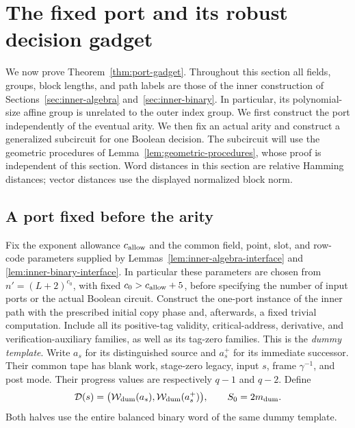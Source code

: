 \section{The fixed port and its robust decision gadget}\label{sec:inner-gadget}

We now prove Theorem~\ref{thm:port-gadget}. Throughout this section all
fields, groups, block lengths, and path labels are those of the inner
construction of Sections~\ref{sec:inner-algebra} and~\ref{sec:inner-binary}.
In particular, its polynomial-size affine group is unrelated to the outer
index group. We first construct the port independently of the eventual
arity. We then fix an actual arity and construct a generalized subcircuit
for one Boolean decision. The subcircuit will use the geometric procedures
of Lemma~\ref{lem:geometric-procedures}, whose proof is independent of this
section. Word distances in this section are relative Hamming distances;
vector distances use the displayed normalized block norm.

\subsection{A port fixed before the arity}

Fix the exponent allowance $c_{\rm allow}$ and the common field, point,
slot, and row-code parameters supplied by
Lemmas~\ref{lem:inner-algebra-interface} and
\ref{lem:inner-binary-interface}. In particular these parameters are
chosen from $n'=(L+2)^{c_0}$, with fixed $c_0>c_{\rm allow}+5$, before
specifying the number of input ports or the actual Boolean circuit.
Construct the one-port instance of the inner path with the prescribed
initial copy phase and, afterwards, a fixed trivial computation. Include
all its positive-tag validity, critical-address, derivative, and
verification-auxiliary families, as well as its tag-zero families. This is
the \emph{dummy template}. Write $a_s$ for its distinguished source and
$a_s^+$ for its immediate successor. Their common tape has blank work,
stage-zero legacy, input $s$, frame $\gamma^{-1}$, and post mode. Their
progress values are respectively $q-1$ and $q-2$. Define
\begin{equation}\label{ig:port-definition}
 \mathcal D(s)=\bigl(\mathcal W_{\rm dum}(a_s),
                         \mathcal W_{\rm dum}(a_s^+)\bigr),
 \qquad S_0=2m_{\rm dum}.
\end{equation}
Both halves use the entire balanced binary word of the same dummy template.

